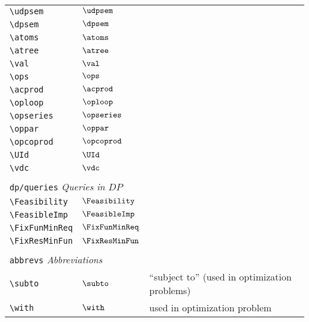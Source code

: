 \begin{longtable}{lll}
 {\color[rgb]{0.5,0.5,0.5}\texttt{\textbackslash udpsem}} & $\udpsem$ & \\ 
 {\color[rgb]{0.5,0.5,0.5}\texttt{\textbackslash dpsem}} & $\dpsem$ & \\ 
 {\color[rgb]{0.5,0.5,0.5}\texttt{\textbackslash atoms}} & $\atoms$ & \\ 
 {\color[rgb]{0.5,0.5,0.5}\texttt{\textbackslash atree}} & $\atree$ & \\ 
 {\color[rgb]{0.5,0.5,0.5}\texttt{\textbackslash val}} & $\val$ & \\ 
 {\color[rgb]{0.5,0.5,0.5}\texttt{\textbackslash ops}} & $\ops$ & \\ 
 {\color[rgb]{0.5,0.5,0.5}\texttt{\textbackslash acprod}} & $\acprod$ & \\ 
 {\color[rgb]{0.5,0.5,0.5}\texttt{\textbackslash oploop}} & $\oploop$ & \\ 
 {\color[rgb]{0.5,0.5,0.5}\texttt{\textbackslash opseries}} & $\opseries$ & \\ 
 {\color[rgb]{0.5,0.5,0.5}\texttt{\textbackslash oppar}} & $\oppar$ & \\ 
 {\color[rgb]{0.5,0.5,0.5}\texttt{\textbackslash opcoprod}} & $\opcoprod$ & \\ 
 {\color[rgb]{0.5,0.5,0.5}\texttt{\textbackslash UId}} & $\UId$ & \\ 
 {\color[rgb]{0.5,0.5,0.5}\texttt{\textbackslash vdc}} & $\vdc$ & \\ 
  &  & \\ 
 \multicolumn{3}{l}{{\color[rgb]{0.5,0.5,0.5}\texttt{dp/queries}} \emph{Queries in $DP$}}\\ 
 \hline
{\color[rgb]{0.5,0.5,0.5}\texttt{\textbackslash Feasibility}} & $\Feasibility$ & \\ 
 {\color[rgb]{0.5,0.5,0.5}\texttt{\textbackslash FeasibleImp}} & $\FeasibleImp$ & \\ 
 {\color[rgb]{0.5,0.5,0.5}\texttt{\textbackslash FixFunMinReq}} & $\FixFunMinReq$ & \\ 
 {\color[rgb]{0.5,0.5,0.5}\texttt{\textbackslash FixResMinFun}} & $\FixResMinFun$ & \\ 
  &  & \\ 
 \multicolumn{3}{l}{{\color[rgb]{0.5,0.5,0.5}\texttt{abbrevs}} \emph{Abbreviations}}\\ 
 \hline
\hline
{\color[rgb]{0.5,0.5,0.5}\texttt{\textbackslash subto}} & $\subto$ &  ``subject to'' (used in optimization problems)\\ 
 {\color[rgb]{0.5,0.5,0.5}\texttt{\textbackslash with}} & $\with$ &  used in optimization problem\\ 

\end{longtable}
